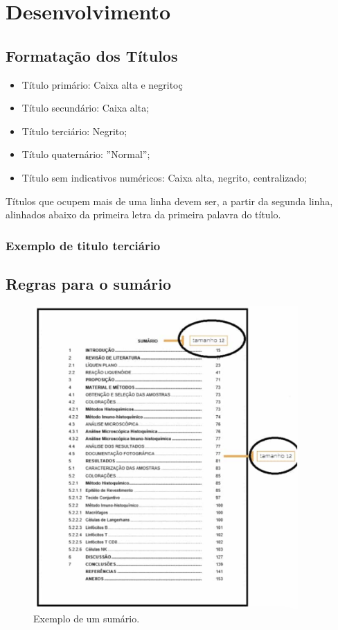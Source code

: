 \section{Desenvolvimento}

\subsection{Formatação dos Títulos}

\begin{itemize}
    \item Título primário: Caixa alta e negritoç
    \item Título secundário: Caixa alta;
    \item Título terciário: Negrito;
    \item Título quaternário: ''Normal'';
    \item Título sem indicativos numéricos: Caixa alta, negrito, centralizado;
\end{itemize}

Títulos que ocupem mais de uma linha devem ser, a partir da segunda linha, alinhados abaixo da primeira letra da primeira palavra do título.

\subsubsection{Exemplo de titulo terciário}

\lipsum[2]

\subsection{Regras para o sumário}

\begin{figure}[h]
    \centering
    \includegraphics[width=0.9\textwidth]{Figuras/exemplo_sumario.png} %
    \caption{Exemplo de um sumário.}
    \label{fig:exemplo_sumario}
\end{figure}

